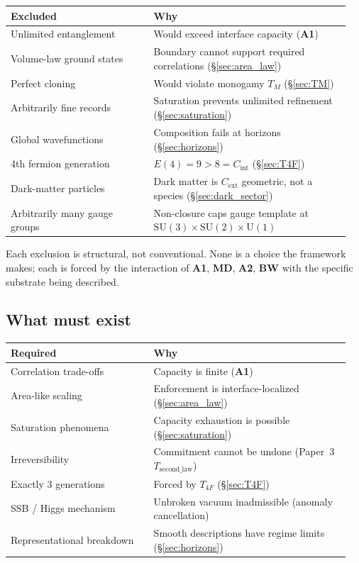 \documentclass[11pt]{article}
\newcommand{\SU}{\mathrm{SU}}
\newcommand{\Un}{\mathrm{U}}
\newcommand{\Aone}{\textbf{A1}}
\newcommand{\Atwo}{\textbf{A2}}
\newcommand{\MD}{\textbf{MD}}
\newcommand{\BW}{\textbf{BW}}
\theoremstyle{definition}
\begin{document}
\begin{center}\small
\begin{tabular}{@{}>{\raggedright\arraybackslash}p{0.40\linewidth} >{\raggedright\arraybackslash}p{0.55\linewidth}@{}}
\toprule
\textbf{Excluded} & \textbf{Why} \\
\midrule
Unlimited entanglement & Would exceed interface capacity (\Aone{}) \\
Volume-law ground states & Boundary cannot support required correlations (\S\ref{sec:area_law}) \\
Perfect cloning & Would violate monogamy $T_M$ (\S\ref{sec:TM}) \\
Arbitrarily fine records & Saturation prevents unlimited refinement (\S\ref{sec:saturation}) \\
Global wavefunctions & Composition fails at horizons (\S\ref{sec:horizons}) \\
4th fermion generation & $E(4) = 9 > 8 = C_{\mathrm{int}}$ (\S\ref{sec:T4F}) \\
Dark-matter particles & Dark matter is $C_{\mathrm{ext}}$ geometric, not a species (\S\ref{sec:dark_sector}) \\
Arbitrarily many gauge groups & Non-closure caps gauge template at $\SU(3)\times\SU(2)\times\Un(1)$ \\
\bottomrule
\end{tabular}
\end{center}

Each exclusion is structural, not conventional. None is a choice the framework makes; each is forced by the interaction of \Aone{}, \MD{}, \Atwo{}, \BW{} with the specific substrate being described.

\subsection{What must exist}\label{sec:exclusions_must_exist}

\begin{center}\small
\begin{tabular}{@{}>{\raggedright\arraybackslash}p{0.40\linewidth} >{\raggedright\arraybackslash}p{0.55\linewidth}@{}}
\toprule
\textbf{Required} & \textbf{Why} \\
\midrule
Correlation trade-offs & Capacity is finite (\Aone{}) \\
Area-like scaling & Enforcement is interface-localized (\S\ref{sec:area_law}) \\
Saturation phenomena & Capacity exhaustion is possible (\S\ref{sec:saturation}) \\
Irreversibility & Commitment cannot be undone (Paper~3 $T_{\mathrm{second\_law}}$) \\
Exactly 3 generations & Forced by $T_{4F}$ (\S\ref{sec:T4F}) \\
SSB / Higgs mechanism & Unbroken vacuum inadmissible (anomaly cancellation) \\
Representational breakdown & Smooth descriptions have regime limits (\S\ref{sec:horizons}) \\
\bottomrule
\end{tabular}
\end{center}
\end{document}
